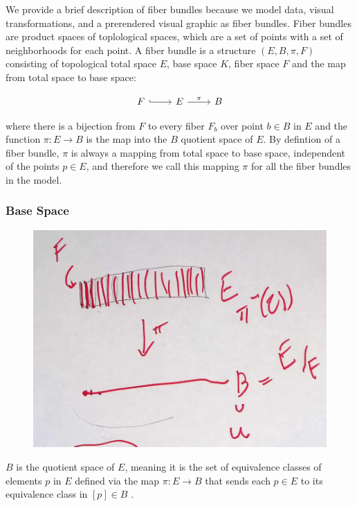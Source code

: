 \documentclass[../main.tex]{subfiles}
\begin{document}
We provide a brief description of fiber bundles because we model data, visual transformations, and a prerendered visual graphic as fiber bundles.  Fiber bundles are product spaces of toplological spaces, which are a set of points with a set of neighborhoods for each point\cite{FiberBundle2020, rowlandFiberBundle}. A fiber bundle is a structure $(E, B, \pi, F)$  consisting of topological total space $E$, base space $K$, fiber space $F$ and the map from total space to base space:

\begin{equation}
    \label{eq:fiber_bundle}
    \begin{tikzcd}
        F \arrow[r, hook] & E \arrow[r, "\pi"] & B
    \end{tikzcd}
\end{equation}

where there is a bijection from $F$ to every fiber $F_b$ over point $b \in B$ in $E$ and the function $\pi: E \rightarrow B$ is the map into the $B$ quotient space of $E$. By defintion of a fiber bundle, $\pi$ is always a mapping from total space to base space, independent of the points $p \in E$, and therefore we call this mapping $\pi$ for all the fiber bundles in the model. 

\subsubsection{Base Space}
\label{sec:base_data}
\begin{figure}[H]
    \label{fig:base_space}
    \includegraphics[width=0.4\linewidth]{figures/sections/math/k_qspace.png}
\end{figure}


$B$ is the quotient space of $E$, meaning it is the set of equivalence classes of elements $p$ in $E$ defined via the map $\pi: E \rightarrow B$ that sends each $p \in E$ to its equivalence class in $[p] \in B$ \cite{QuotientSpaceTopology2020,QuotientSpaceTopology2020}.
\end{document}
